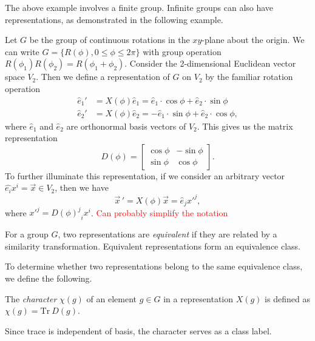 The above example involves a finite group. Infinite groups can also have representations, as demonstrated in the following example.
\begin{example}
    Let $G$ be the group of continuous rotations in the $xy$-plane about the origin. We can write $G = \{R(\phi),0\leq\phi\leq2\pi\}$ with group operation $R(\phi_1)R(\phi_2) = R(\phi_1+\phi_2)$. Consider the 2-dimensional Euclidean vector space $V_2$. Then we define a representation of $G$ on $V_2$ by the familiar rotation operation
    \begin{align}
        \hat{e}_1' &= X(\phi)\hat{e}_1 = \hat{e}_1\cdot\cos\phi + \hat{e}_2\cdot\sin\phi\\
        \hat{e}_2' &= X(\phi)\hat{e}_2 = -\hat{e}_1\cdot\sin\phi + \hat{e}_2\cdot\cos\phi,
    \end{align}
    where $\hat{e}_1$ and $\hat{e}_2$ are orthonormal basis vectors of $V_2$. This gives us the matrix representation
    \begin{equation}
        D(\phi) = \begin{bmatrix}
            \cos\phi & -\sin\phi\\
            \sin\phi & \cos\phi
        \end{bmatrix}.
    \end{equation}
    To further illuminate this representation, if we consider an arbitrary vector $\hat{e_i}x^i=\vec{x}\in V_2$, then we have
    \begin{equation}
        \vec{x}\,' = X(\phi)\vec{x} = \hat{e}_j{x'}^j,
    \end{equation}
    where ${x'}^j = {{D(\phi)}^j}_i x^i$.
    \textcolor{red}{Can probably simplify the notation}
\end{example}

\begin{definition}
    For a group $G$, two representations are \textit{equivalent} if they are related by a similarity transformation. Equivalent representations form an equivalence class.
\end{definition}

To determine whether two representations belong to the same equivalence class, we define the following.
\begin{definition}
    The \textit{character} $\chi(g)$ of an element $g\in G$ in a representation $X(g)$ is defined as $\chi(g) = \text{Tr}~D(g)$.
\end{definition}
Since trace is independent of basis, the character serves as a class label.

